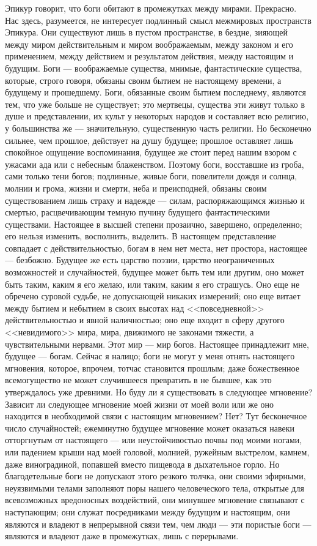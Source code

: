 \documentclass[12pt,oneside]{book}
\begin{document}
Эпикур говорит, что боги обитают в промежутках между мирами. Прекрасно. Нас здесь, разумеется, не интересует подлинный смысл межмировых пространств Эпикура. Они существуют лишь в пустом пространстве, в бездне, зияющей между миром действительным и миром воображаемым, между законом и его применением, между действием и результатом действия, между настоящим и будущим. Боги --- воображаемые существа, мнимые, фантастические существа, которые, строго говоря, обязаны своим бытием не настоящему времени, а будущему и прошедшему. Боги, обязанные своим бытием последнему, являются тем, что уже больше не существует; это мертвецы, существа эти живут только в душе и представлении, их культ у некоторых народов и составляет всю религию, у большинства же --- значительную, существенную часть религии. Но бесконечно сильнее, чем прошлое, действует на душу будущее; прошлое оставляет лишь спокойное ощущение воспоминания, будущее же стоит перед нашим взором с ужасами ада или с небесным блаженством. Поэтому боги, восставшие из гроба, сами только тени богов; подлинные, живые боги, повелители дождя и солнца, молнии и грома, жизни и смерти, неба и преисподней, обязаны своим существованием лишь страху и надежде --- силам, распоряжающимся жизнью и смертью, расцвечивающим темную пучину будущего фантастическими существами. Настоящее в высшей степени прозаично, завершено, определенно; его нельзя изменить, восполнить, выделить. В настоящем представление совпадает с действительностью, богам в нем нет места, нет простора, настоящее --- безбожно. Будущее же есть царство поэзии, царство неограниченных возможностей и случайностей, будущее может быть тем или другим, оно может быть таким, каким я его желаю, или таким, каким я его страшусь. Оно еще не обречено суровой судьбе, не допускающей никаких измерений; оно еще витает между бытием и небытием в своих высотах над <<повседневной>> действительностью и явной наличностью; оно еще входит в сферу другого <<невидимого>> мира, мира, движимого не законами тяжести, а чувствительными нервами. Этот мир --- мир богов. Настоящее принадлежит мне, будущее --- богам. Сейчас я налицо; боги не могут у меня отнять настоящего мгновения, которое, впрочем, тотчас становится прошлым; даже божественное всемогущество не может случившееся превратить в не бывшее, как это утверждалось уже древними. Но буду ли я существовать в следующее мгновение? Зависит ли следующее мгновение моей жизни от моей воли или же оно находится в необходимой связи с настоящим мгновением? Нет? Тут бесконечное число случайностей; ежеминутно будущее мгновение может оказаться навеки отторгнутым от настоящего --- или неустойчивостью почвы под моими ногами, или падением крыши над моей головой, молнией, ружейным выстрелом, камнем, даже виноградиной, попавшей вместо пищевода в дыхательное горло. Но благодетельные боги не допускают этого резкого толчка, они своими эфирными, неуязвимыми телами заполняют поры нашего человеческого тела, открытые для всевозможных вредоносных воздействий, они минувшее мгновение связывают с наступающим; они служат посредниками между будущим и настоящим, они являются и владеют в непрерывной связи тем, чем люди --- эти пористые боги --- являются и владеют даже в промежутках, лишь с перерывами.
\end{document}
